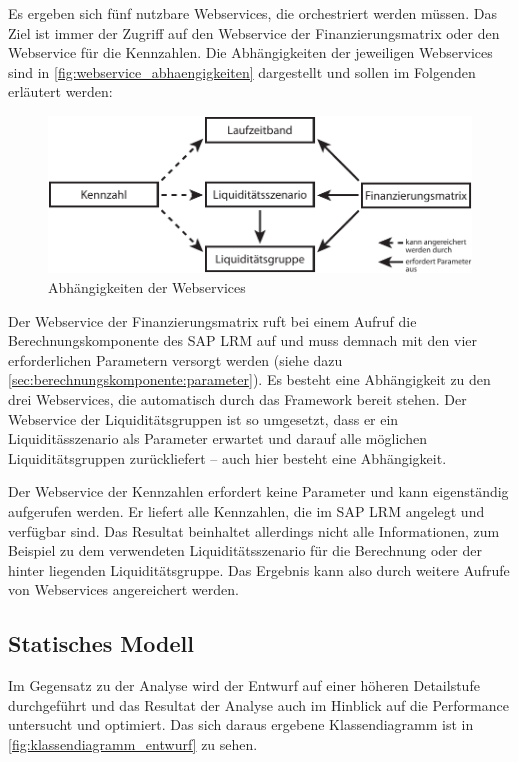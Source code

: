 \begin{onehalfspacing}
Es ergeben sich fünf nutzbare Webservices, die orchestriert werden müssen. Das Ziel ist immer der Zugriff auf den Webservice der Finanzierungsmatrix oder den Webservice für die Kennzahlen. Die Abhängigkeiten der jeweiligen Webservices sind in \vref{fig:webservice_abhaengigkeiten} dargestellt und sollen im Folgenden erläutert werden:

\begin{figure}[!ht]
\centering
\setlength{\unitlength}{1mm}
\includegraphics[width=15cm]{images/Abbildung14-Abhaengigkeiten-Webservices.pdf}
\caption{Abhängigkeiten der Webservices\label{fig:webservice_abhaengigkeiten}}
\end{figure}


Der Webservice der Finanzierungsmatrix ruft bei einem Aufruf die Berechnungskomponente des SAP LRM auf und muss demnach mit den vier erforderlichen Parametern versorgt werden (siehe dazu \vref{sec:berechnungskomponente:parameter}). Es besteht eine Abhängigkeit zu den drei Webservices, die automatisch durch das Framework  bereit stehen. Der Webservice der Liquiditätsgruppen ist so umgesetzt, dass er ein Liquiditässzenario als Parameter erwartet und darauf alle möglichen Liquiditätsgruppen zurückliefert -- auch hier besteht eine Abhängigkeit.

Der Webservice der Kennzahlen erfordert keine Parameter und kann eigenständig aufgerufen werden. Er liefert alle Kennzahlen, die im SAP LRM angelegt und verfügbar sind. Das Resultat beinhaltet allerdings nicht alle Informationen, zum Beispiel zu dem verwendeten Liquiditätsszenario für die Berechnung oder der hinter liegenden Liquiditätsgruppe. Das Ergebnis kann also durch weitere Aufrufe von Webservices angereichert werden.

\subsection{Statisches Modell}
Im Gegensatz zu der Analyse wird der Entwurf auf einer höheren Detailstufe durchgeführt und das Resultat der Analyse auch im Hinblick auf die Performance untersucht und optimiert. Das sich daraus ergebene Klassendiagramm ist in \vref{fig:klassendiagramm_entwurf} zu sehen.



\end{onehalfspacing}
